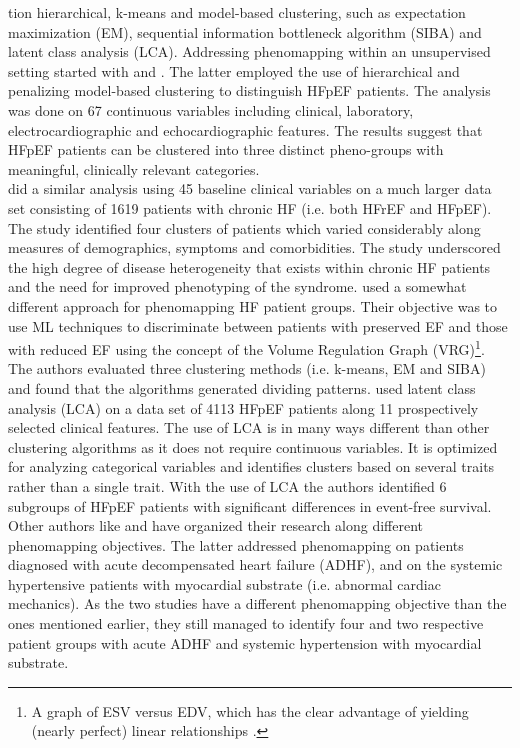 \documentclass[../thesis.tex]{subfiles}
\begin{document}
\noindent tion hierarchical, k-means and model-based clustering, such as expectation maximization (EM), sequential information bottleneck algorithm (SIBA) and latent class analysis (LCA). Addressing phenomapping within an unsupervised setting started with \cite{ahmad2014clinical} and \cite{shah2014phenomapping}. The latter employed the use of hierarchical and penalizing model-based clustering to distinguish HFpEF patients. The analysis was done on 67 continuous variables including clinical, laboratory, electrocardiographic and echocardiographic features. The results suggest that HFpEF patients can be clustered into three distinct pheno-groups with meaningful, clinically relevant categories.\\
\indent \cite{ahmad2014clinical} did a similar analysis using 45 baseline clinical variables on a much larger data set consisting of 1619 patients with chronic HF (i.e. both HFrEF and HFpEF). The study identified four clusters of patients which varied considerably along measures of demographics, symptoms and comorbidities. The study underscored the high degree of disease heterogeneity that exists within chronic HF patients and the need for improved phenotyping of the syndrome. \cite{alonso2015exploring} used a somewhat different approach for phenomapping HF patient groups. Their objective was to use ML techniques to discriminate between patients with preserved EF and those with reduced EF using the concept of the Volume Regulation Graph (VRG)\footnote{A graph of ESV versus EDV, which has the clear advantage of yielding (nearly perfect) linear relationships \citep{beringer1998unifying}.}. The authors evaluated three clustering methods (i.e. k-means, EM and SIBA) and found that the algorithms generated dividing patterns. \cite{kao2015characterization} used latent class analysis (LCA) on a data set of 4113 HFpEF patients along 11 prospectively selected clinical features. The use of LCA is in many ways different than other clustering algorithms as it does not require continuous variables. It is optimized for analyzing categorical variables and identifies clusters based on several traits rather than a single trait. With the use of LCA the authors identified 6 subgroups of HFpEF patients with significant differences in event-free survival. Other authors like \cite{katz2017phenomapping} and \cite{ahmad2016clinical} have organized their research along different phenomapping objectives. The latter addressed phenomapping on patients diagnosed with acute decompensated heart failure (ADHF), and \cite{katz2017phenomapping} on the systemic hypertensive patients with myocardial substrate (i.e. abnormal cardiac mechanics). As the two studies have a different phenomapping objective than the ones mentioned earlier, they still managed to identify four and two respective patient groups with acute ADHF and systemic hypertension with myocardial substrate.\\
\end{document}

